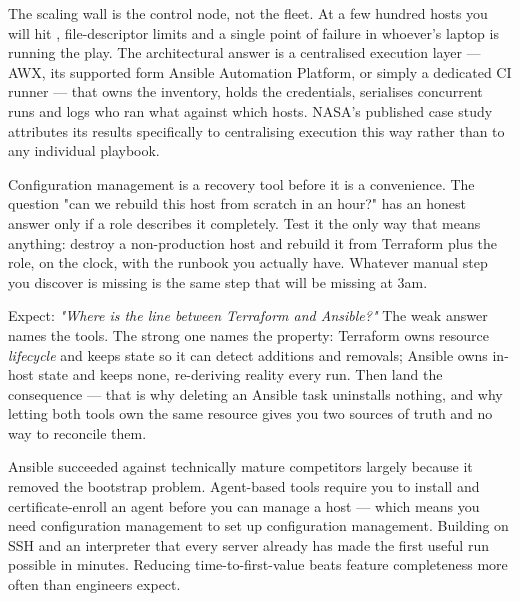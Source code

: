 \begin{scalenote}
The scaling wall is the control node, not the fleet. At a few hundred hosts you will hit , file-descriptor limits and a single point of failure in whoever's laptop is running the play. The architectural answer is a centralised execution layer --- AWX, its supported form Ansible Automation Platform, or simply a dedicated CI runner --- that owns the inventory, holds the credentials, serialises concurrent runs and logs who ran what against which hosts. NASA's published case study attributes its results specifically to centralising execution this way rather than to any individual playbook.
\end{scalenote}

\begin{drtip}
Configuration management is a recovery tool before it is a convenience. The question "can we rebuild this host from scratch in an hour?" has an honest answer only if a role describes it completely. Test it the only way that means anything: destroy a non-production host and rebuild it from Terraform plus the role, on the clock, with the runbook you actually have. Whatever manual step you discover is missing is the same step that will be missing at 3am.
\end{drtip}

\begin{interview}
Expect: \emph{"Where is the line between Terraform and Ansible?"} The weak answer names the tools. The strong one names the property: Terraform owns resource \emph{lifecycle} and keeps state so it can detect additions and removals; Ansible owns in-host state and keeps none, re-deriving reality every run. Then land the consequence --- that is why deleting an Ansible task uninstalls nothing, and why letting both tools own the same resource gives you two sources of truth and no way to reconcile them.
\end{interview}

\begin{whyexists}
Ansible succeeded against technically mature competitors largely because it removed the bootstrap problem. Agent-based tools require you to install and certificate-enroll an agent before you can manage a host --- which means you need configuration management to set up configuration management. Building on SSH and an interpreter that every server already has made the first useful run possible in minutes. Reducing time-to-first-value beats feature completeness more often than engineers expect.
\end{whyexists}

